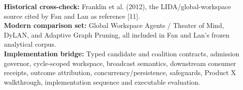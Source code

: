 \textbf{Historical cross-check:} Franklin et al. (2012), the LIDA/global-workspace source cited by Fan and Lan as reference [11].\\
\textbf{Modern comparison set:} Global Workspace Agents / Theater of Mind, DyLAN, and Adaptive Graph Pruning, all included in Fan and Lan's frozen analytical corpus.\\
\textbf{Implementation bridge:} Typed candidate and coalition contracts, admission governor, cycle-scoped workspace, broadcast semantics, downstream consumer receipts, outcome attribution, concurrency/persistence, safeguards, Product X walkthrough, implementation sequence and executable evaluation.\\

\backmatter
\nocite{fanlan2026mechanisms,franklin2012lida,shang2026theaterofmind,liu2024dylan,li2025adaptivegraphpruning}
\printbibliography[heading=bibintoc,title={References}]

